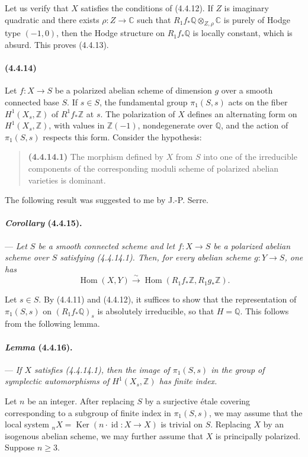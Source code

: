 \documentclass[10pt]{article}
\newcommand{\C}{\mathbb C}
\newcommand{\Q}{\mathbb Q}
\newcommand{\Z}{\mathbb Z}
\newcommand{\Ker}{\operatorname{Ker}}
\newcommand{\Hom}{\operatorname{Hom}}
\newcommand{\iso}{\xrightarrow{\sim}}
\begin{document}
Let us verify that $X$ satisfies the conditions of (4.4.12). If $Z$ is imaginary quadratic and there exists $\rho:Z\to\C$ such that $R_1f_*\Q\otimes_{Z,\rho}\C$ is purely of Hodge type $(-1,0)$, then the Hodge structure on $R_1f_*\Q$ is locally constant, which is absurd. This proves (4.4.13).

\paragraph{(4.4.14)} Let $f:X\to S$ be a polarized abelian scheme of dimension $g$ over a smooth connected base $S$. If $s\in S$, the fundamental group $\pi_1(S,s)$ acts on the fiber $H^1(X_s,\Z)$ of $R^1f_*\Z$ at $s$. The polarization of $X$ defines an alternating form on $H^1(X_s,\Z)$, with values in $\Z(-1)$, nondegenerate over $\Q$, and the action of $\pi_1(S,s)$ respects this form. Consider the hypothesis:
\begin{quote}
\noindent\textbf{(4.4.14.1)} The morphism defined by $X$ from $S$ into one of the irreducible components of the corresponding moduli scheme of polarized abelian varieties is dominant.
\end{quote}
The following result was suggested to me by J.-P. Serre.

\paragraph{\emph{Corollary} (4.4.15).} --- {\itshape Let $S$ be a smooth connected scheme and let $f:X\to S$ be a polarized abelian scheme over $S$ satisfying (4.4.14.1). Then, for every abelian scheme $g:Y\to S$, one has
\[
\Hom(X,Y)\iso\Hom(R_1f_*\Z,R_1g_*\Z).
\]}

Let $s\in S$. By (4.4.11) and (4.4.12), it suffices to show that the representation of $\pi_1(S,s)$ on $(R_1f_*\Q)_s$ is absolutely irreducible, so that $H=\Q$. This follows from the following lemma.

\paragraph{\emph{Lemma} (4.4.16).} --- {\itshape If $X$ satisfies (4.4.14.1), then the image of $\pi_1(S,s)$ in the group of symplectic automorphisms of $H^1(X_s,\Z)$ has finite index.}

Let $n$ be an integer. After replacing $S$ by a surjective étale covering corresponding to a subgroup of finite index in $\pi_1(S,s)$, we may assume that the local system ${}_nX=\Ker(n\cdot \operatorname{id}:X\to X)$ is trivial on $S$. Replacing $X$ by an isogenous abelian scheme, we may further assume that $X$ is principally polarized. Suppose $n\ge3$.
\end{document}
